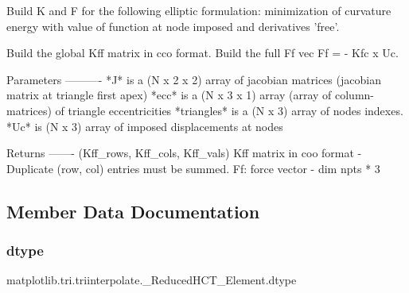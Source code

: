 \begin{DoxyVerb}Build K and F for the following elliptic formulation:
minimization of curvature energy with value of function at node
imposed and derivatives 'free'.

Build the global Kff matrix in cco format.
Build the full Ff vec Ff = - Kfc x Uc.

Parameters
----------
*J* is a (N x 2 x 2) array of jacobian matrices (jacobian matrix at
triangle first apex)
*ecc* is a (N x 3 x 1) array (array of column-matrices) of triangle
eccentricities
*triangles* is a (N x 3) array of nodes indexes.
*Uc* is (N x 3) array of imposed displacements at nodes

Returns
-------
(Kff_rows, Kff_cols, Kff_vals) Kff matrix in coo format - Duplicate
(row, col) entries must be summed.
Ff: force vector - dim npts * 3
\end{DoxyVerb}
 

\subsection{Member Data Documentation}
\mbox{\label{classmatplotlib_1_1tri_1_1triinterpolate_1_1__ReducedHCT__Element_af91526793c04164e4dcc22d47c25f1d1}} 
\subsubsection{\texorpdfstring{dtype}{dtype}}
{\footnotesize\ttfamily matplotlib.\+tri.\+triinterpolate.\+\_\+\+Reduced\+H\+C\+T\+\_\+\+Element.\+dtype\hspace{0.3cm}{\ttfamily [static]}}

\mbox{\label{classmatplotlib_1_1tri_1_1triinterpolate_1_1__ReducedHCT__Element_af2ee8b4aa1709a48a352953862b7b43e}} 
